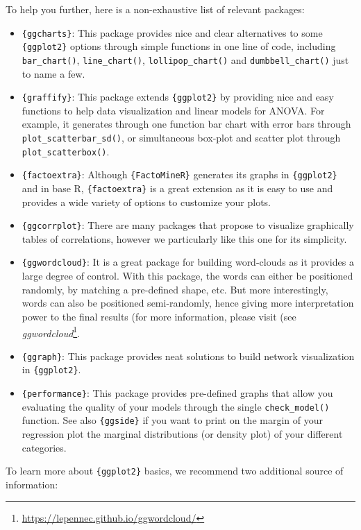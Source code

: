 \documentclass[
]{krantz}
\providecommand{\tightlist}{%
  \setlength{\itemsep}{0pt}\setlength{\parskip}{0pt}}
\renewcommand{\href}[2]{#2\footnote{\url{#1}}}
\begin{document}
To help you further, here is a non-exhaustive list of relevant packages:

\begin{itemize}
\tightlist
\item
  \texttt{\{ggcharts\}}: This package provides nice and clear alternatives to some \texttt{\{ggplot2\}} options through simple functions in one line of code, including \texttt{bar\_chart()}, \texttt{line\_chart()}, \texttt{lollipop\_chart()} and \texttt{dumbbell\_chart()} just to name a few.
\item
  \texttt{\{graffify\}}: This package extends \texttt{\{ggplot2\}} by providing nice and easy functions to help data visualization and linear models for ANOVA. For example, it generates through one function bar chart with error bars through \texttt{plot\_scatterbar\_sd()}, or simultaneous box-plot and scatter plot through \texttt{plot\_scatterbox()}.
\item
  \texttt{\{factoextra\}}: Although \texttt{\{FactoMineR\}} generates its graphs in \texttt{\{ggplot2\}} and in base R, \texttt{\{factoextra\}} is a great extension as it is easy to use and provides a wide variety of options to customize your plots.
\item
  \texttt{\{ggcorrplot\}}: There are many packages that propose to visualize graphically tables of correlations, however we particularly like this one for its simplicity.
\item
  \texttt{\{ggwordcloud\}}: It is a great package for building word-clouds as it provides a large degree of control. With this package, the words can either be positioned randomly, by matching a pre-defined shape, etc. But more interestingly, words can also be positioned semi-randomly, hence giving more interpretation power to the final results (for more information, please visit (see \href{https://lepennec.github.io/ggwordcloud/}{\emph{ggwordcloud}}.
\item
  \texttt{\{ggraph\}}: This package provides neat solutions to build network visualization in \texttt{\{ggplot2\}}.
\item
  \texttt{\{performance\}}: This package provides pre-defined graphs that allow you evaluating the quality of your models through the single \texttt{check\_model()} function. See also \texttt{\{ggside\}} if you want to print on the margin of your regression plot the marginal distributions (or density plot) of your different categories.
\end{itemize}

To learn more about \texttt{\{ggplot2\}} basics, we recommend two additional source of information:
\end{document}

